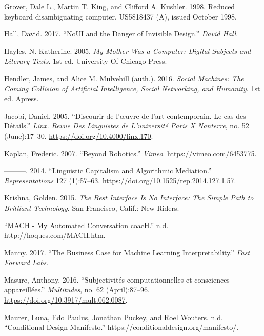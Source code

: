\documentclass[]{article}
\begin{document}
\leavevmode\hypertarget{ref-Grover1998}{}%
Grover, Dale L., Martin T. King, and Clifford A. Kushler. 1998. Reduced
keyboard disambiguating computer. US5818437 (A), issued October 1998.

\leavevmode\hypertarget{ref-Hall2017}{}%
Hall, David. 2017. ``NoUI and the Danger of Invisible Design.''
\emph{David Hall}.

\leavevmode\hypertarget{ref-Hayles2005}{}%
Hayles, N. Katherine. 2005. \emph{My Mother Was a Computer: Digital
Subjects and Literary Texts}. 1st ed. University Of Chicago Press.

\leavevmode\hypertarget{ref-Hendler2016}{}%
Hendler, James, and Alice M. Mulvehill (auth.). 2016. \emph{Social
Machines: The Coming Collision of Artificial Intelligence, Social
Networking, and Humanity}. 1st ed. Apress.

\leavevmode\hypertarget{ref-Jacobi2005}{}%
Jacobi, Daniel. 2005. ``Discourir de l'œuvre de l'art contemporain. Le
cas des Détails.'' \emph{Linx. Revue Des Linguistes de L'université
Paris X Nanterre}, no. 52 (June):17--30.
\url{https://doi.org/10.4000/linx.170}.

\leavevmode\hypertarget{ref-Kaplan2007}{}%
Kaplan, Frederic. 2007. ``Beyond Robotics.'' \emph{Vimeo}.
https://vimeo.com/6453775.

\leavevmode\hypertarget{ref-Kaplan2014}{}%
---------. 2014. ``Linguistic Capitalism and Algorithmic Mediation.''
\emph{Representations} 127 (1):57--63.
\url{https://doi.org/10.1525/rep.2014.127.1.57}.

\leavevmode\hypertarget{ref-Krishna2015}{}%
Krishna, Golden. 2015. \emph{The Best Interface Is No Interface: The
Simple Path to Brilliant Technology}. San Francisco, Calif.: New Riders.

\leavevmode\hypertarget{ref-zotero-28}{}%
``MACH - My Automated Conversation coacH.'' n.d.
http://hoques.com/MACH.htm.

\leavevmode\hypertarget{ref-Manny2017}{}%
Manny. 2017. ``The Business Case for Machine Learning
Interpretability.'' \emph{Fast Forward Labs}.

\leavevmode\hypertarget{ref-Masure2016}{}%
Masure, Anthony. 2016. ``Subjectivités computationnelles et consciences
appareillées.'' \emph{Multitudes}, no. 62 (April):87--96.
\url{https://doi.org/10.3917/mult.062.0087}.

\leavevmode\hypertarget{ref-Maurer}{}%
Maurer, Luna, Edo Paulus, Jonathan Puckey, and Roel Wouters. n.d.
``Conditional Design Manifesto.''
https://conditionaldesign.org/manifesto/.
\end{document}
